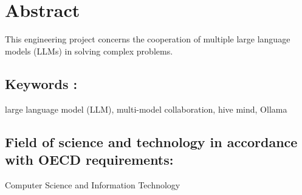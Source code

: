\chapter*{Abstract}
{}
This engineering project concerns the cooperation of multiple large language models (LLMs) in solving complex problems.

\section*{Keywords :}
\noindent large language model (LLM), multi-model collaboration, hive mind, Ollama
\section*{Field of science and technology in accordance with OECD requirements:}
\noindent Computer Science and Information Technology
